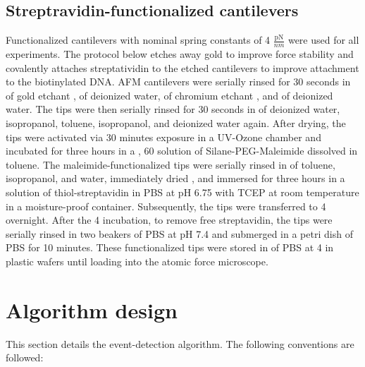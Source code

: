 \section{Streptravidin-functionalized cantilevers}

Functionalized cantilevers with nominal spring constants of 4 $\frac{\text{pN}}{nm}$  were used for all experiments. The protocol below etches away gold to improve force stability\cite{sullan_atomic_2013} and covalently attaches streptatividin to the etched cantilevers to improve attachment to the biotinylated DNA. AFM cantilevers  were serially rinsed for 30 seconds in  of gold etchant ,  of deionized water,  of chromium etchant , and  of deionized water. The tips were then serially rinsed for 30 seconds in  of deionized water, isopropanol, toluene, isopropanol, and deionized water again. After drying, the tips were activated via 30 minutes exposure in a UV-Ozone chamber and incubated for three hours in a , 60\degreeC{} solution of   Silane-PEG-Maleimide  dissolved in toluene. The maleimide-functionalized tips were serially rinsed in  of toluene, isopropanol, and water, immediately dried , and immersed for three hours in a  solution of thiol-streptavidin  in PBS at pH 6.75 with  TCEP  at room temperature in a moisture-proof container. Subsequently, the tips were transferred to 4\degreeC{} overnight. After the 4\degreeC{} incubation, to remove free streptavidin, the tips were serially rinsed in two  beakers of PBS at pH 7.4 and submerged in a  petri dish of PBS for 10 minutes. These functionalized tips were stored in  of PBS at 4\degreeC{} in plastic wafers  until loading into the atomic force microscope. 



\chapter{ Algorithm design}

This section details the event-detection algorithm. The following conventions are followed:


